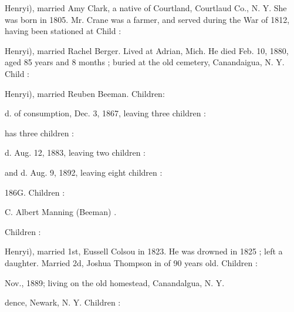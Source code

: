 \documentclass[oneside]{book}
\begin{document}
Henryi), married Amy Clark, a native of Courtland, Courtlaud 
Co., N. Y. She was born in 1805. Mr. Crane was a farmer, 
and served during the War of 1812, having been stationed at 
Child : 


Henryi), married Rachel Berger. Lived at Adrian, Mich. He 
died Feb. 10, 1880, aged 85 years and 8 months ; buried at the 
old cemetery, Canandaigua, N. Y. Child : 


Henryi), married Reuben Beeman. Children: 














d. of consumption, Dec. 3, 1867, leaving three children : 





has three children : 





d. Aug. 12, 1883, leaving two children : 




and d. Aug. 9, 1892, leaving eight children : 













186G. Children : 






C. Albert Manning (Beeman) . 


Children : 




Henryi), married 1st, Eussell Colsou in 1823. He was drowned 
in 1825 ; left a daughter. Married 2d, Joshua Thompson in 
of 90 years old. Children : 









Nov., 1889; living on the old homestead, Canandalgua, N. Y. 





dence, Newark, N. Y. Children : 
\end{document}
